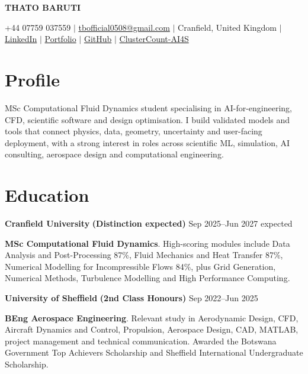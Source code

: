 \documentclass[10pt,a4paper]{article}
\begin{document}
\fontsize{9.65}{10.95}\selectfont

\begin{center}
{\fontsize{21.5}{23.5}\selectfont\textbf{THATO BARUTI}}\par
\footnotesize +44 07759 037559 $\mid$ \href{mailto:tbofficial0508@gmail.com}{tbofficial0508@gmail.com} $\mid$ Cranfield, United Kingdom $\mid$
\href{https://www.linkedin.com/in/thato-baruti-63b290222/}{LinkedIn} $\mid$
\href{https://tbofficial0508-jpg.github.io/ThatoBaruti619.github.io-/}{Portfolio} $\mid$
\href{https://github.com/tbofficial0508-jpg}{GitHub} $\mid$
\href{https://github.com/tbofficial0508-jpg/cluster-count-ai4s}{ClusterCount-AI4S}
\end{center}
\vspace{-5pt}

\section{Profile}
MSc Computational Fluid Dynamics student specialising in AI-for-engineering, CFD, scientific software and design optimisation. I build validated models and tools that connect physics, data, geometry, uncertainty and user-facing deployment, with a strong interest in roles across scientific ML, simulation, AI consulting, aerospace design and computational engineering.

\section{Education}
\textbf{Cranfield University} \textbf{(Distinction expected)} \hfill Sep 2025--Jun 2027 expected\par
\textbf{MSc Computational Fluid Dynamics}. High-scoring modules include Data Analysis and Post-Processing 87\%, Fluid Mechanics and Heat Transfer 87\%, Numerical Modelling for Incompressible Flows 84\%, plus Grid Generation, Numerical Methods, Turbulence Modelling and High Performance Computing.

\textbf{University of Sheffield} \textbf{(2nd Class Honours)} \hfill Sep 2022--Jun 2025\par
\textbf{BEng Aerospace Engineering}. Relevant study in Aerodynamic Design, CFD, Aircraft Dynamics and Control, Propulsion, Aerospace Design, CAD, MATLAB, project management and technical communication. Awarded the Botswana Government Top Achievers Scholarship and Sheffield International Undergraduate Scholarship.
\end{document}
